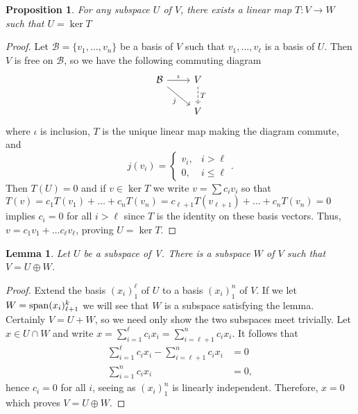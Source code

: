 \documentclass[12pt]{article}
\theoremstyle{definition}
\theoremstyle{plain}
\newtheorem{proposition}[theorem] {Proposition}
\newtheorem{lemma}[theorem]{Lemma}
\numberwithin{equation}{section}
\theoremstyle{definition}
\begin{document}
\begin{proposition}
For any subspace $ U $ of $ V $, there exists a linear map $ T : V \to W $ such that $ U = \ker T $
\end{proposition}

\begin{proof}
Let $ \mathcal{B} = \{ v_1, \ldots, v_n \} $ be a basis of $ V $ such that $ v_1, \ldots, v_{\ell} $ is a basis of $ U $. Then $ V $ is free on $ \mathcal{B} $, so we have the following commuting diagram
\[\begin{tikzcd} 
	\mathcal{B} \arrow[dr, "j"'] \arrow[r, "\iota"] & V \arrow[d, dashed, "T"]\\
	& V
\end{tikzcd}\]
where $ \iota $ is inclusion, $ T $ is the unique linear map making the diagram commute, and
\[ j(v_i) = 
\begin{cases}
	v_i, &i > \ell\\
	0, &i \leq \ell
\end{cases}.\]
Then $ T(U) = 0 $ and if $ v \in \ker T $ we write $ v = \sum c_i v_i $ so that $ T(v) = c_1 T(v_1) + \ldots + c_n T(v_n) = c_{\ell + 1} T(v_{\ell+1}) + \ldots + c_n T(v_n) = 0 $ implies $ c_i = 0 $ for all $ i > \ell $ since $ T $ is the identity on these basis vectors. Thus, $ v = c_1 v_1 + \ldots c_\ell v_\ell $, proving $ U = \ker T $.
\end{proof}

\begin{lemma}
Let $ U$ be a subspace of V. There is a subspace $ W $ of $ V $ such that $ V = U \oplus W $.
\end{lemma}

\begin{proof}
Extend the basis $ (x_i)_1^\ell $ of $U $ to a basis $ (x_i)_1^n $ of $ V $. If we let $ W = \operatorname{span} (x_i)_{\ell+1}^k $ we will see that $ W $ is a subspace satisfying the lemma. Certainly $ V = U + W $, so we need only show the two subspaces meet trivially. Let $ x \in U \cap W $ and write $ x = \sum_{i=1}^\ell c_i x_i = \sum_{i=\ell + 1}^n c_i x_i $. It follows that 
\begin{align*}
	\sum_{i=1}^\ell c_i x_i - \sum_{i=\ell + 1}^n c_i x_i &= 0\\
	\sum_{i = 1}^n c_i x_i &= 0,
\end{align*}
hence $ c_i = 0 $ for all $ i $, seeing as $ (x_i)_1^n $ is linearly independent. Therefore, $ x = 0 $ which proves $ V = U \oplus W $.
\end{proof}
\end{document}
